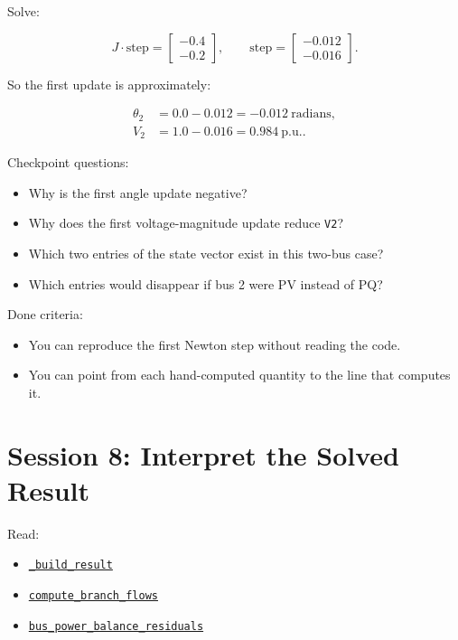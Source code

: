 \documentclass[11pt]{article}
\newcommand{\code}[1]{\texttt{#1}}
\newcommand{\pu}{\mathrm{p.u.}}
\begin{document}
Solve:

\[
J \cdot \mathrm{step} =
\begin{bmatrix}
-0.4 \\
-0.2
\end{bmatrix},
\qquad
\mathrm{step} =
\begin{bmatrix}
-0.012 \\
-0.016
\end{bmatrix}.
\]

So the first update is approximately:

\begin{align*}
\theta_2 &= 0.0 - 0.012 = -0.012\ \mathrm{radians}, \\
V_2 &= 1.0 - 0.016 = 0.984\ \pu.
\end{align*}

Checkpoint questions:

\begin{itemize}
  \item Why is the first angle update negative?
  \item Why does the first voltage-magnitude update reduce \code{V2}?
  \item Which two entries of the state vector exist in this two-bus case?
  \item Which entries would disappear if bus 2 were PV instead of PQ?
\end{itemize}

Done criteria:

\begin{itemize}
  \item You can reproduce the first Newton step without reading the code.
  \item You can point from each hand-computed quantity to the line that computes
  it.
\end{itemize}

\section{Session 8: Interpret the Solved Result}

Read:

\begin{itemize}
  \item \href{../src/powerflow/solver.py\#L195}{\code{\_build\_result}}
  \item \href{../src/powerflow/flows.py\#L39}{\code{compute\_branch\_flows}}
  \item \href{../src/powerflow/solver.py\#L221}{\code{bus\_power\_balance\_residuals}}
\end{itemize}
\end{document}
